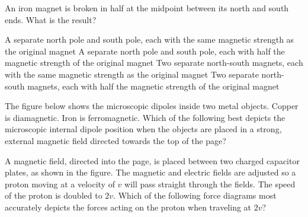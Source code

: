 \documentclass{../../oss-apphys-exam}
\begin{document}
\begin{questions}
  \question An iron magnet is broken in half at the midpoint between its north
  and south ends. What is the result?
  \begin{choices}
    \choice A separate north pole and south pole, each with the same
    magnetic strength as the original magnet
    \choice A separate north pole and south pole, each with half the magnetic
    strength of the original magnet 
    \choice Two separate north-south magnets, each with the same magnetic
    strength as the original magnet
    \choice Two separate north-south magnets, each with half the magnetic
    strength of the original magnet
  \end{choices}
  \newpage
  
  \question The figure below shows the microscopic dipoles inside two metal
  objects. Copper is diamagnetic. Iron is ferromagnetic. Which of the following
  best depicts the microscopic internal dipole position when the objects
  are placed in a strong, external magnetic field directed towards the top
  of the page?

 

  \question A magnetic field, directed into the page, is placed between two
  charged capacitor plates, as shown in the figure. The magnetic and electric
  fields are adjusted so a proton moving at a velocity of $v$ will pass straight
  through the fields. The speed of the proton is doubled to $2v$. Which of the
  following force diagrams most accurately depicts the forces acting on the
  proton when traveling at $2v$?
  \begin{center}
  \end{center}
  
  \begin{choices}
    \choice
    

\end{choices}
\end{questions}
\end{document}
